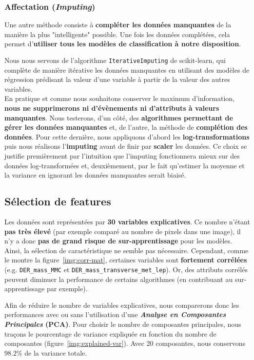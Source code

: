 \documentclass[12pt]{article}
\newcommand{\figref}[1]{figure~\ref{#1}}
\begin{document}
\subsubsection{Affectation (\emph{Imputing})}

Une autre méthode consiste à \textbf{compléter les données manquantes} de la
manière la plus "intelligente" possible. Une fois les données complétées, cela
permet d’\textbf{utiliser tous les modèles de classification à notre
disposition}. 

Nous nous servons de l’algorithme \texttt{IterativeImputing} de
scikit-learn, qui complète de manière itérative les données manquantes en
utilisant des modèles de régression prédisant la valeur d’une variable à partir
de la valeur des autres variables. \\

En pratique et comme nous souhaitons conserver le maximum d'information,
\textbf{nous ne supprimerons ni d'évènements ni d'attributs à valeurs
manquantes}. Nous testerons, d'un côté, des \textbf{algorithmes permettant de
gérer les données manquantes} et, de l'autre, la méthode de \textbf{complétion
des données}. Pour cette dernière, nous appliquons d'abord les
\textbf{log-transformations} puis nous réalisons l’\textbf{imputing} avant de
finir par \textbf{scaler} les données. Ce choix se justifie premièrement par
l’intuition que l’imputing fonctionnera mieux sur des données log-transformées
et, deuxièmement, par le fait qu’estimer la moyenne et la variance en ignorant
les données manquantes serait biaisé.

\subsection{Sélection de features}

Les données sont représentées par \textbf{30 variables explicatives}. Ce nombre
n’étant \textbf{pas très élevé} (par exemple comparé au nombre de pixels dans
une image), il n’y a donc \textbf{pas de grand risque de sur-apprentissage} pour
les modèles. Ainsi, la sélection de caractéristique ne semble pas nécessaire.
Cependant, comme le montre la \figref{img:corr-mat}, certaines variables sont
\textbf{fortement corrélées} (e.g. \texttt{DER\_mass\_MMC} et
\texttt{DER\_mass\_transverse\_met\_lep}). Or, des attributs corrélés peuvent
diminuer la performance de certains algorithmes (en contribuant au
sur-apprentissage par exemple).

\begin{mdframed}[hidealllines=true,backgroundcolor=blue!20]
Afin de réduire le nombre de variables explicatives, nous comparerons donc les
performances avec ou sans l’utilisation d’une \textbf{\emph{Analyse en
Composantes Principales} (PCA)}. Pour choisir le nombre de composantes
principales, nous traçons le pourcentage de variance expliquée en fonction du
nombre de composantes (\figref{img:explained-var}). Avec 20 composantes, nous
conservons $98.2\%$ de la variance totale.
\end{mdframed}
\end{document}
